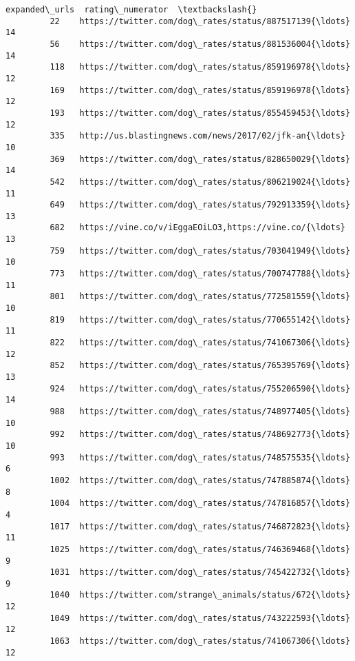 \documentclass[11pt]{article}
\begin{document}
\begin{Verbatim}[commandchars=\\\{\}]
                                                   expanded\_urls  rating\_numerator  \textbackslash{}
         22    https://twitter.com/dog\_rates/status/887517139{\ldots}                14   
         56    https://twitter.com/dog\_rates/status/881536004{\ldots}                14   
         118   https://twitter.com/dog\_rates/status/859196978{\ldots}                12   
         169   https://twitter.com/dog\_rates/status/859196978{\ldots}                12   
         193   https://twitter.com/dog\_rates/status/855459453{\ldots}                12   
         335   http://us.blastingnews.com/news/2017/02/jfk-an{\ldots}                10   
         369   https://twitter.com/dog\_rates/status/828650029{\ldots}                14   
         542   https://twitter.com/dog\_rates/status/806219024{\ldots}                11   
         649   https://twitter.com/dog\_rates/status/792913359{\ldots}                13   
         682   https://vine.co/v/iEggaEOiLO3,https://vine.co/{\ldots}                13   
         759   https://twitter.com/dog\_rates/status/703041949{\ldots}                10   
         773   https://twitter.com/dog\_rates/status/700747788{\ldots}                11   
         801   https://twitter.com/dog\_rates/status/772581559{\ldots}                10   
         819   https://twitter.com/dog\_rates/status/770655142{\ldots}                11   
         822   https://twitter.com/dog\_rates/status/741067306{\ldots}                12   
         852   https://twitter.com/dog\_rates/status/765395769{\ldots}                13   
         924   https://twitter.com/dog\_rates/status/755206590{\ldots}                14   
         988   https://twitter.com/dog\_rates/status/748977405{\ldots}                10   
         992   https://twitter.com/dog\_rates/status/748692773{\ldots}                10   
         993   https://twitter.com/dog\_rates/status/748575535{\ldots}                 6   
         1002  https://twitter.com/dog\_rates/status/747885874{\ldots}                 8   
         1004  https://twitter.com/dog\_rates/status/747816857{\ldots}                 4   
         1017  https://twitter.com/dog\_rates/status/746872823{\ldots}                11   
         1025  https://twitter.com/dog\_rates/status/746369468{\ldots}                 9   
         1031  https://twitter.com/dog\_rates/status/745422732{\ldots}                 9   
         1040  https://twitter.com/strange\_animals/status/672{\ldots}                12   
         1049  https://twitter.com/dog\_rates/status/743222593{\ldots}                12   
         1063  https://twitter.com/dog\_rates/status/741067306{\ldots}                12   

\end{Verbatim}
\end{document}
